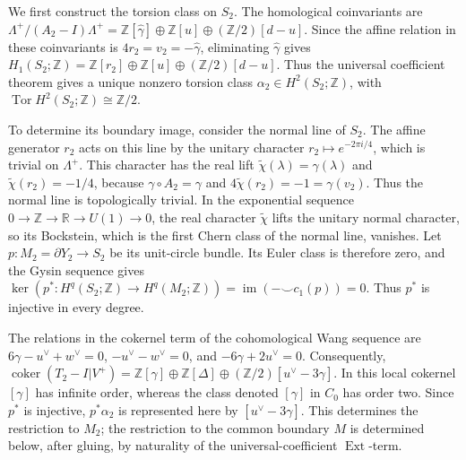 We first construct the torsion class on $S_2$.  The homological
coinvariants are
$\Lambda^+/(A_2-I)\Lambda^+=\mathbb Z[\widehat\gamma]\oplus\mathbb Z[u]
\oplus(\mathbb Z/2)[d-u]$.  Since the affine relation in these coinvariants
is $4r_2=v_2=-\widehat\gamma$, eliminating $\widehat\gamma$ gives
$H_1(S_2;\mathbb Z)=\mathbb Z[r_2]\oplus\mathbb Z[u]
\oplus(\mathbb Z/2)[d-u]$.  Thus the universal coefficient theorem gives a
unique nonzero torsion class
$\alpha_2\in H^2(S_2;\mathbb Z)$, with
$\operatorname{Tor}H^2(S_2;\mathbb Z)\cong\mathbb Z/2$.

To determine its boundary image, consider the normal line of $S_2$.  The
affine generator $r_2$ acts on this line by the unitary
character $r_2\mapsto e^{-2\pi i/4}$, which is trivial on $\Lambda^+$.
This character has the real lift
$\widetilde\chi(\lambda)=\gamma(\lambda)$ and
$\widetilde\chi(r_2)=-1/4$,
because $\gamma\circ A_2=\gamma$ and
$4\widetilde\chi(r_2)=-1=\gamma(v_2)$.  Thus the normal line is
topologically trivial.  In the exponential sequence
$0\to\mathbb Z\to\mathbb R\to U(1)\to0$, the real character
$\widetilde\chi$ lifts the unitary normal character, so its Bockstein,
which is the first Chern class of the normal line, vanishes.  Let
$p:M_2=\partial Y_2\to S_2$ be its unit-circle bundle.  Its Euler class is
therefore zero, and the Gysin sequence gives
$\ker(p^*:H^q(S_2;\mathbb Z)\to H^q(M_2;\mathbb Z))
=\operatorname{im}({-}\smile c_1(p))=0$.
Thus $p^*$ is injective in every degree.

The relations in the cokernel term of the cohomological Wang sequence are
$6\gamma-u^\vee+w^\vee=0$, $-u^\vee-w^\vee=0$, and
$-6\gamma+2u^\vee=0$.  Consequently,
$\operatorname{coker}(T_2-I|V^+)
=\mathbb Z[\gamma]\oplus\mathbb Z[\Delta]
\oplus(\mathbb Z/2)[u^\vee-3\gamma]$.
In this local cokernel $[\gamma]$ has infinite order, whereas the class
denoted $[\gamma]$ in $C_0$ has order two.  Since $p^*$ is injective,
$p^*\alpha_2$ is represented here by $[u^\vee-3\gamma]$.  This determines
the restriction to $M_2$; the restriction to the common boundary $M$ is
determined below, after gluing, by naturality of the universal-coefficient
$\operatorname{Ext}$-term.

